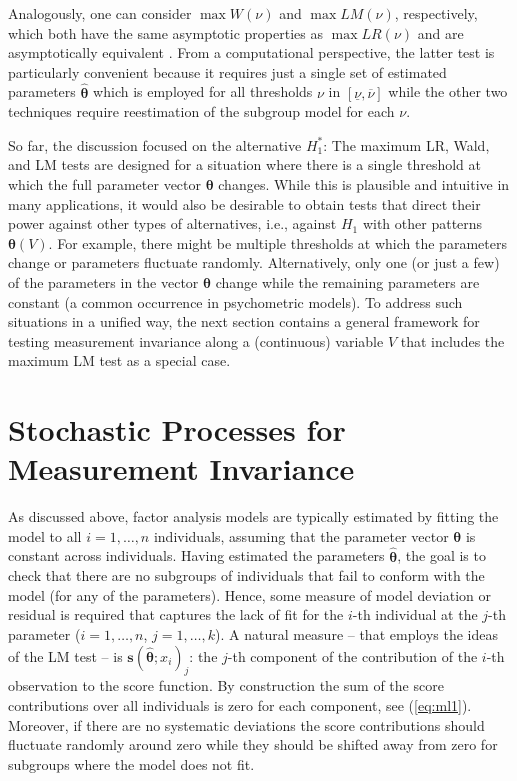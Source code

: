 \documentclass[man]{apa}
\begin{document}
Analogously, one can consider $\max W(\nu)$ and
$\max \mathit{LM}(\nu)$, respectively, which both have the same asymptotic properties
as $\max \mathit{LR}(\nu)$ and are asymptotically equivalent \cite{And93}.
From a computational perspective, the latter test is particularly convenient
because it requires just a single set of estimated parameters $\hat {\bm \theta}$
which is employed for all thresholds $\nu$ in $[\underline{\nu}, \overline{\nu}]$
while the other two techniques require reestimation of the subgroup model for each
$\nu$.

So far, the discussion focused on the alternative $H_1^*$: The maximum LR, Wald, and LM
tests are designed for a situation where there is a single threshold at which the full
parameter vector ${\bm \theta}$ changes. While this is plausible and intuitive
in many applications, it would also be desirable to obtain tests that direct their power
against other types of alternatives, i.e., against $H_1$ with other patterns ${\bm \theta}(V)$.
For example, there might be multiple thresholds at which the parameters change or parameters
fluctuate randomly. Alternatively, only one (or just a few) of the parameters in
the vector ${\bm \theta}$ change while the remaining parameters are
constant (a common occurrence in psychometric models).
To address such situations in a unified way, the next section contains 
a general framework for testing measurement invariance along a
(continuous) variable $V$ that
includes the maximum LM test as a special case.


\section{Stochastic Processes for Measurement Invariance}

As discussed above, factor analysis models are typically
estimated by fitting the model to all $i = 1, \dots, n$ individuals, assuming
that the parameter vector ${\bm \theta}$ is constant across individuals.
Having estimated the parameters $\hat {\bm \theta}$, the goal is to check that
there are no subgroups of individuals that fail to conform with the model (for any
of the parameters). Hence, some measure of model deviation or residual is required
that captures the lack of fit for the $i$-th individual at the $j$-th parameter
($i = 1, \dots, n$, $j = 1, \dots, k$). A natural measure -- that employs the ideas
of the LM test -- is ${\bm s}(\hat {\bm \theta}; x_i)_j$: the $j$-th component of the
contribution of the $i$-th observation to the score function. By construction the sum
of the score contributions over all individuals is zero for each component, see
(\ref{eq:ml1}). Moreover, if there are no systematic deviations the score contributions
should fluctuate randomly around zero while they should be shifted away from zero for
subgroups where the model does not fit.
\end{document}
